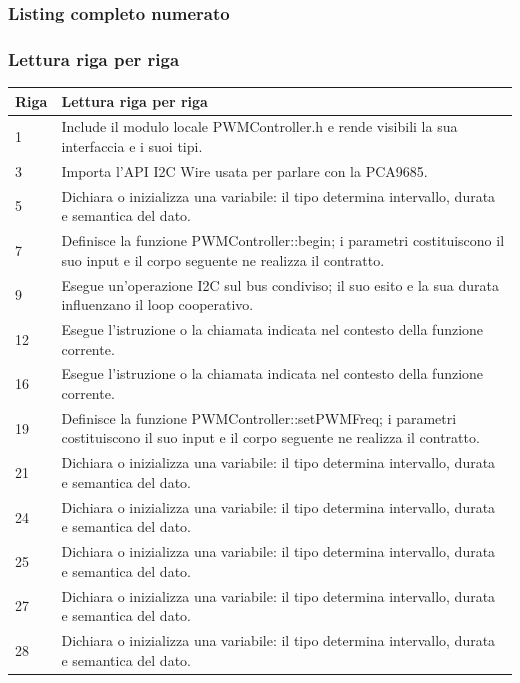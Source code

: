 \documentclass[11pt,a4paper]{article}
\begin{document}
\subsubsection{Listing completo numerato}


\subsubsection{Lettura riga per riga}
\begin{longtable}{p{}p{}}
\toprule
\textbf{Riga} & \textbf{Lettura riga per riga} \\
\midrule
\endhead
1 & Include il modulo locale PWMController.h e rende visibili la sua interfaccia e i suoi tipi. \\
3 & Importa l'API I2C Wire usata per parlare con la PCA9685. \\
5 & Dichiara o inizializza una variabile: il tipo determina intervallo, durata e semantica del dato. \\
7 & Definisce la funzione PWMController::begin; i parametri costituiscono il suo input e il corpo seguente ne realizza il contratto. \\
9 & Esegue un'operazione I2C sul bus condiviso; il suo esito e la sua durata influenzano il loop cooperativo. \\
12 & Esegue l'istruzione o la chiamata indicata nel contesto della funzione corrente. \\
16 & Esegue l'istruzione o la chiamata indicata nel contesto della funzione corrente. \\
19 & Definisce la funzione PWMController::setPWMFreq; i parametri costituiscono il suo input e il corpo seguente ne realizza il contratto. \\
21 & Dichiara o inizializza una variabile: il tipo determina intervallo, durata e semantica del dato. \\
24 & Dichiara o inizializza una variabile: il tipo determina intervallo, durata e semantica del dato. \\
25 & Dichiara o inizializza una variabile: il tipo determina intervallo, durata e semantica del dato. \\
27 & Dichiara o inizializza una variabile: il tipo determina intervallo, durata e semantica del dato. \\
28 & Dichiara o inizializza una variabile: il tipo determina intervallo, durata e semantica del dato. \\

\end{longtable}
\end{document}
